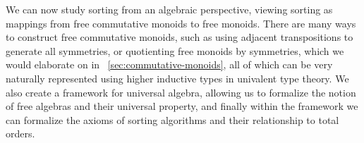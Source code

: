 We can now study sorting from an algebraic perspective, viewing sorting as mappings from free commutative
monoids to free monoids. There are many ways to construct free commutative monoids, such as using adjacent transpositions to generate all symmetries, or quotienting free monoids by symmetries, which we would
elaborate on in ~\cref{sec:commutative-monoids}, all of which can be very naturally represented
using higher inductive types in univalent type theory. We also
create a framework for universal algebra, allowing us to formalize the notion of free algebras and
their universal property, and finally within the framework we can formalize the axioms of sorting
algorithms and their relationship to total orders.


